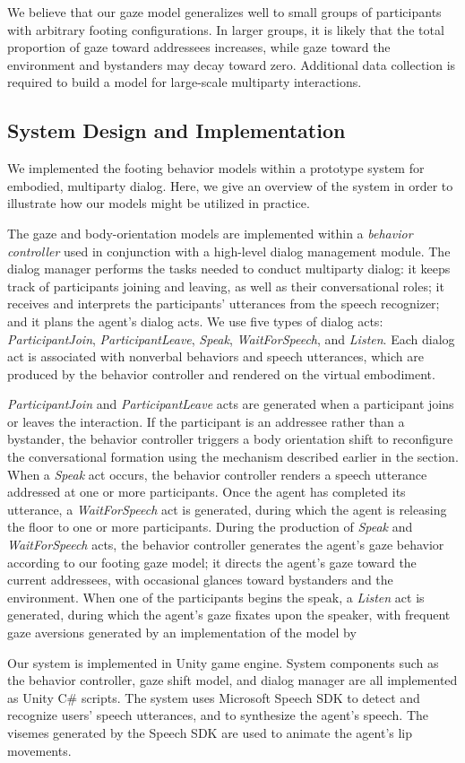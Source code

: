 We believe that our gaze model generalizes well to small groups of participants with arbitrary footing configurations. In larger groups, it is likely that the total proportion of gaze toward addressees increases, while gaze toward the environment and bystanders may decay toward zero. Additional data collection is required to build a model for large-scale multiparty interactions.

\subsection{System Design and Implementation}

We implemented the footing behavior models within a prototype system for embodied, multiparty dialog. Here, we give an overview of the system in order to illustrate how our models might be utilized in practice.

The gaze and body-orientation models are implemented within a \emph{behavior controller} used in conjunction with a high-level dialog management module. The dialog manager performs the tasks needed to conduct multiparty dialog: it keeps track of participants joining and leaving, as well as their conversational roles; it receives and interprets the participants' utterances from the speech recognizer; and it plans the agent's dialog acts. We use five types of dialog acts: \emph{ParticipantJoin}, \emph{ParticipantLeave}, \emph{Speak}, \emph{WaitForSpeech}, and \emph{Listen}. Each dialog act is associated with nonverbal behaviors and speech utterances, which are produced by the behavior controller and rendered on the virtual embodiment.

\emph{ParticipantJoin} and \emph{ParticipantLeave} acts are generated when a participant joins or leaves the interaction. If the participant is an addressee rather than a bystander, the behavior controller triggers a body orientation shift to reconfigure the conversational formation using the mechanism described earlier in the section. When a \emph{Speak} act occurs, the behavior controller renders a speech utterance addressed at one or more participants. Once the agent has completed its utterance, a \emph{WaitForSpeech} act is generated, during which the agent is releasing the floor to one or more participants. During the production of \emph{Speak} and \emph{WaitForSpeech} acts, the behavior controller generates the agent's gaze behavior according to our footing gaze model; it directs the agent's gaze toward the current addressees, with occasional glances toward bystanders and the environment. When one of the participants begins the speak, a \emph{Listen} act is generated, during which the agent's gaze fixates upon the speaker, with frequent gaze aversions generated by an implementation of the model by~\citet{lee2002eyes}

Our system is implemented in Unity game engine. System components such as the behavior controller, gaze shift model, and dialog manager are all implemented as Unity C\# scripts. The system uses Microsoft Speech SDK to detect and recognize users' speech utterances, and to synthesize the agent's speech. The visemes generated by the Speech SDK are used to animate the agent's lip movements. 